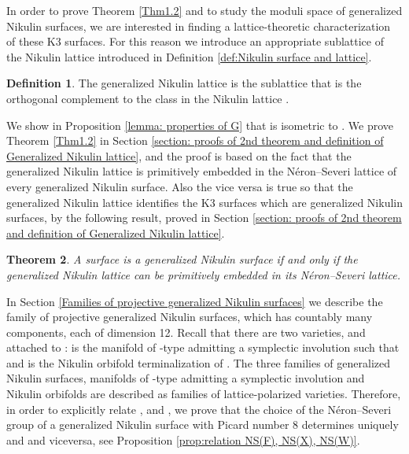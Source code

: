 \documentclass{amsart}
\makeatletter
\newtheorem{thm}{Theorem}[section]
\theoremstyle{definition}
\newtheorem{defi}[thm]{Definition}
\numberwithin{equation}{section}
\numberwithin{equation}{section} \theoremstyle{definition}
\DeclareMathOperator{\NS}{NS}
\DeclareMathOperator{\T}{T}
\DeclareMathOperator{\Fix}{Fix}
\newcounter{mathrecordid}
\newcommand{\mathboxbegin}[1]{%
  \stepcounter{mathrecordid}%
  \immediate\write\mathrecords{\themathrecordid,#1}%
  \special{pdf:bann << /Type /Annot /Subtype /Link /Border [0 0 0]
    /MathBoxID \themathrecordid /F 2
    /A << /S /URI /URI (urn:mathbox:\themathrecordid) >> >>}}
\newcommand{\mathboxinlineplain}[1]{$#1$}
\newcommand{\mathboxinline}[1]{%
  $\mathboxbegin{inline}#1\special{pdf:eann}$}
\newcommand{\recordmath}{%
  \ifmeasuring@\expandafter\mathboxinlineplain
  \else\expandafter\mathboxinline\fi}
\makeatother
\begin{document}
In order to prove Theorem \ref{Thm1.2} and to study the moduli space of generalized Nikulin surfaces,  we are interested in finding a lattice-theoretic characterization of these K3 surfaces. For this reason we introduce an appropriate sublattice of the Nikulin lattice introduced in Definition \ref{def:Nikulin surface and lattice}.

\begin{defi}\label{defi: generalizad Nikulin orbifold}
The generalized 
Nikulin lattice is the sublattice \recordmath{G\subset N} that is the orthogonal complement to the class \recordmath{\frac{1}{2}(\sum_i E_i)} in the Nikulin lattice \recordmath{N}.\end{defi}

We show in Proposition \ref{lemma: properties of G} that \recordmath{G} is isometric to \recordmath{E_7(-2)}.
We  prove Theorem \ref{Thm1.2} in Section \ref{section: proofs of 2nd theorem and definition of Generalized Nikulin lattice}, and the proof is  based on the fact that the generalized Nikulin lattice is primitively embedded in the N\'eron--Severi lattice of every generalized Nikulin surface. Also the vice versa is true so that the generalized Nikulin lattice identifies the K3 surfaces which are generalized Nikulin surfaces, by the following result, proved in Section \ref{section: proofs of 2nd theorem and definition of Generalized Nikulin lattice}.

\begin{thm}\label{thm: projective $K3$ G polarized are generalized Nikulin}
A \recordmath{K3} surface is a generalized Nikulin surface if and only if the generalized Nikulin lattice can be primitively embedded in its N\'eron--Severi lattice.
\end{thm}

In Section \ref{Families of projective generalized Nikulin surfaces} we  describe the family of projective generalized Nikulin surfaces, which has countably many components, each of dimension 12. Recall that there are two varieties, \recordmath{X} and \recordmath{Y} attached to \recordmath{F}: \recordmath{X} is the  manifold of \recordmath{K3^{[2]}}-type admitting a symplectic involution \recordmath{\iota} such that \recordmath{\Fix_{\iota}(X)\supset F} and \recordmath{Y} is the Nikulin orbifold terminalization of \recordmath{X/\iota}. The three families of generalized Nikulin surfaces,  manifolds of \recordmath{K3^{[2]}}-type admitting a symplectic involution and  Nikulin orbifolds are described as families of lattice-polarized varieties. Therefore, in order to explicitly relate \recordmath{F}, \recordmath{X} and \recordmath{Y}, we prove that the choice of the N\'eron--Severi group of a generalized Nikulin surface \recordmath{F} with Picard number 8 determines uniquely \recordmath{(\NS(X), \T_X)} and \recordmath{(\NS(Y), \T_Y)} and viceversa, see Proposition \ref{prop:relation NS(F), NS(X), NS(W)}.
\end{document}
